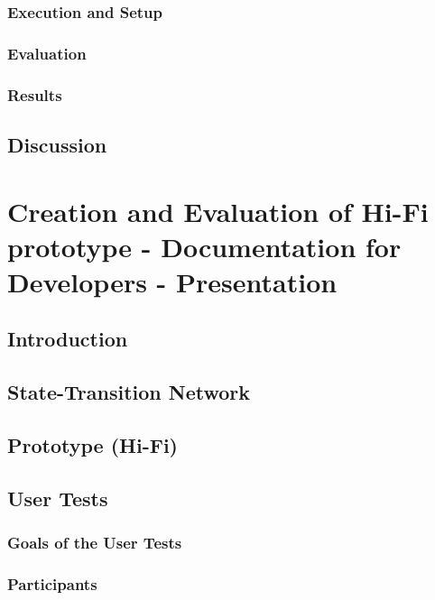 \documentclass[11pt]{report}
\begin{document}
\subsection{Execution and Setup}

\subsection{Evaluation}

\subsection{Results}

\section{Discussion}

\chapterfont{\LARGE \centering}
\chaptertitlefont{\Large \centering}
\chapter{Creation and Evaluation of  Hi-Fi prototype - Documentation for Developers - Presentation}

\section{Introduction}

\section{State-Transition Network}

\section{Prototype (Hi-Fi)}

\section{User Tests}

\subsection{Goals of the User Tests}

\subsection{Participants}
\end{document}
